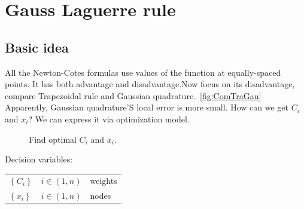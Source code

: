 \documentclass[
10pt, %
a4paper, %
oneside, %
headinclude,footinclude, %
BCOR5mm, %
]{scrartcl}
\theoremstyle{definition}
\begin{document}
\section{Gauss Laguerre rule}
\subsection{Basic idea}
All the Newton-Cotes formulas use values of the function at equally-spaced points. It has both advantage and disadvantage.Now  focus on its disadvantage, compare  Trapezoidal rule and Gaussian quadrature.~\vref{fig:ComTraGau}
Apparently, Gaussian quadrature'S local error is more small. How can we get $C_i$ and $x_i$? We can express it via optimization model.
\begin{figure}[tb]
\centering
{} \quad
{}
\caption[Find optimal $C_i$ and $x_i$]{Find optimal $C_i$ and $x_i$.}%
\end{figure}


\noindent Decision variables:\\
\begin{tabular}{lll}
 \quad$\left\{C_i\right\}$ &$i\in\left(1,n\right)$ & weights\\
 \quad$\left\{x_i\right\}$ &$i\in\left(1,n\right)$ & nodes
 \end{tabular}
\end{document}
